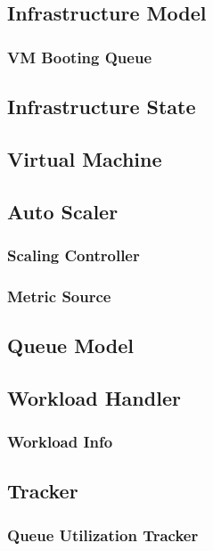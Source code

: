 \subsection{Infrastructure Model}

\subsubsection{VM Booting Queue}

\subsection{Infrastructure State}

\subsection{Virtual Machine}


\subsection{Auto Scaler}

\subsubsection{Scaling Controller}

\subsubsection{Metric Source}




\subsection{Queue Model}


\subsection{Workload Handler}

\subsubsection{Workload Info}


\subsection{Tracker}

\subsubsection{Queue Utilization Tracker}


